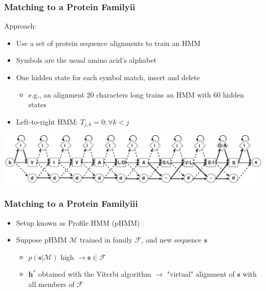 \documentclass[11pt]{beamer}
\newcommand{\vect}[1]{\boldsymbol{\mathbf{#1}}}
\begin{document}
    \begin{frame}
        \frametitle{Matching to a Protein Family\quad ii}
        Approach:
        \begin{itemize}
            \item Use a set of protein sequence alignments to train an HMM
            \item Symbols are the usual amino acid's alphabet
            \item One hidden state for each symbol match, insert and delete
            \begin{itemize}
                \item e.g., an alignment 20 characters long trains an HMM with 60 hidden states
            \end{itemize}
            \item Left-to-right HMM: $T_{j, k} = 0;\forall k<j$
        \end{itemize}
        \centering
        \includegraphics[width=\textwidth]{images/phmm_example.png}
    \end{frame}
    
    \begin{frame}
        \frametitle{Matching to a Protein Family\quad iii}
        \begin{itemize}
            \item Setup known as Profile HMM (pHMM)
            \item Suppose pHMM $\mathcal{M}$ trained in family $\mathcal{F}$, and new sequence $\vect{s}$
            \begin{itemize}
                \item $p(\vect{s}|\mathcal{M})$ high $\rightarrow \vect{s}\in \mathcal{F}$ 
                \item $\vect{h}^*$ obtained with the Viterbi algorithm $\rightarrow$ "virtual" alignment of $\vect{s}$ with all members of $\mathcal{F}$
            \end{itemize}
        \end{itemize}
    \end{frame}
    
\end{document}
